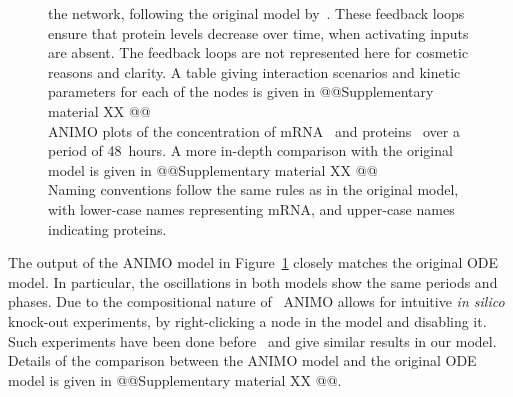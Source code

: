 \begin{figure}[!htpb]
{the network, following the original model by~\cite{drosophila-ode-model}. These feedback loops ensure that 
protein levels decrease over time, when activating inputs are absent. The feedback loops are not represented here 
for cosmetic reasons and clarity. A table giving interaction scenarios and kinetic parameters for each of the nodes 
is given in @@Supplementary material XX @@\\
ANIMO plots of the concentration of
mRNA~{\bfseries \protect{}}
and proteins~{\bfseries \protect{}} over a period of 48~hours.
A more in-depth comparison with the original model is given in @@Supplementary material XX @@\\
Naming conventions follow the same rules
as in the original model, with lower-case names representing mRNA, and upper-case names indicating proteins.
}\label{fig:drosophila}
\end{figure}


The output of the ANIMO model in Figure~\ref{fig:drosophila} closely matches the original ODE model.
In particular, the oscillations in both models show the same periods and phases.
Due to the compositional nature of \tas\, ANIMO allows for intuitive \emph{in silico} knock-out experiments,
by right-clicking a node in the model and disabling it. Such experiments have been done 
before~\citep{drosophila-ode-model} and give similar results in our model. Details of the comparison
between the ANIMO model and the original ODE model is given in @@Supplementary material XX @@.



